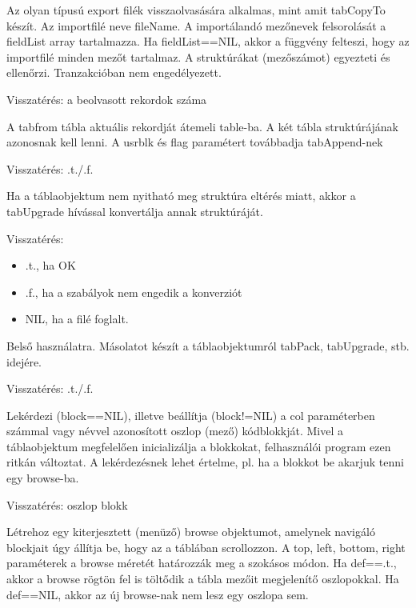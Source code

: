 Az olyan típusú export filék visszaolvasására alkalmas,
mint amit tabCopyTo készít. Az importfilé neve fileName.
A importálandó mezőnevek felsorolását a fieldList array
tartalmazza. Ha fieldList==NIL, akkor a függvény felteszi,
hogy az importfilé minden mezőt tartalmaz. A struktúrákat
(mezőszámot) egyezteti és ellenőrzi. 
Tranzakcióban nem engedélyezett.

Visszatérés: a beolvasott rekordok száma


A  tabfrom tábla aktuális rekordját átemeli table-ba.
A két tábla struktúrájának azonosnak kell lenni. 
A usrblk és flag paramétert továbbadja tabAppend-nek

Visszatérés: .t./.f.
 
Ha a táblaobjektum nem nyitható meg struktúra eltérés miatt,
akkor a tab\-Upgrade hívással konvertálja annak struktúráját.

Visszatérés:
\begin{itemize}
\item .t., ha OK 
\item .f., ha a szabályok nem engedik a konverziót 
\item NIL, ha a filé foglalt.
\end{itemize}
 


Belső használatra. Másolatot készít a táblaobjektumról
tabPack, tabUpgrade, stb. idejére.

Visszatérés: .t./.f.


Lekérdezi (block==NIL), illetve beállítja (block!=NIL)
a col paraméterben számmal vagy névvel azonosított oszlop
(mező) kódblokkját. Mivel a táblaobjektum megfelelően
inicializálja a blokkokat, felhasználói program 
ezen ritkán változtat.  A lekérdezésnek lehet értelme, 
pl. ha a blokkot be akarjuk tenni egy browse-ba.

Visszatérés: oszlop blokk


Létrehoz egy kiterjesztett (menüző) browse objektumot,
amelynek navigáló blockjait úgy állítja be, hogy az
a táblában scrollozzon. A top, left, bottom, right
paraméterek a browse méretét határozzák meg a 
szokásos módon. Ha def==.t., akkor a browse rögtön
fel is töltődik a tábla mezőit megjelenítő oszlopokkal.
Ha def==NIL, akkor az új browse-nak nem lesz egy oszlopa sem.

